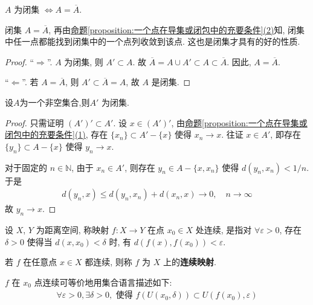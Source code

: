 \documentclass[../../main.tex]{subfiles}
\begin{document}
\begin{theorem}
$A$ 为闭集 $\Leftrightarrow A = \overline{A}$.
\end{theorem}
\begin{remark}
闭集 $A = \overline{A}$, 再由\hyperref[proposition:一个点在导集或闭包中的充要条件]{命题\ref{proposition:一个点在导集或闭包中的充要条件}(2)}知, 闭集中任一点都能找到闭集中的一个点列收敛到该点. 这也是闭集才具有的好的性质.
\end{remark}
\begin{proof}
“$\Rightarrow$”. $A$ 为闭集, 则 $A' \subset A$. 故 $\overline{A} = A \cup A' \subset A \subset \overline{A}$. 因此, $A = \overline{A}$.

“$\Leftarrow$”. 若 $A = \overline{A}$, 则 $A' \subset \overline{A} = A$, 故 $A$ 是闭集.

\end{proof}

\begin{theorem}
设$A$为一个非空集合,则$A'$ 为闭集.
\end{theorem}
\begin{proof}
只需证明 $(A')' \subset A'$. 设 $x \in (A')'$, 由\hyperref[proposition:一个点在导集或闭包中的充要条件]{命题\ref{proposition:一个点在导集或闭包中的充要条件}(1)}, 存在 $\{x_n\} \subset A' - \{x\}$ 使得 $x_n \to x$. 往证 $x \in A'$, 即存在 $\{y_n\} \subset A - \{x\}$ 使得 $y_n \to x$.

对于固定的 $n \in \mathbb{N}$, 由于 $x_n \in A'$, 则存在 $y_n \in A - \{x, x_n\}$ 使得 $d(y_n, x_n) < 1/n$. 于是
\begin{align*}
d(y_n, x) \leqslant d(y_n, x_n) + d(x_n, x) \to 0, \quad n \to \infty
\end{align*}
故 $y_n \to x$.

\end{proof}

\begin{definition}[连续映射]
设 $X$, $Y$ 为距离空间, 称映射 $f : X \to Y$ 在点 $x_0 \in X$ 处连续, 是指对 $\forall \varepsilon > 0$, 存在 $\delta > 0$ 使得当 $d(x, x_0) < \delta$ 时, 有 $d(f(x), f(x_0)) < \varepsilon$.

若 $f$ 在任意点 $x \in X$ 都连续, 则称 $f$ 为 $X$ 上的\textbf{连续映射}.
\end{definition}
\begin{remark}
$f$ 在 $x_0$ 点连续可等价地用集合语言描述如下:
\begin{align*}
\forall \varepsilon > 0, \exists \delta > 0, \text{ 使得 } f(U(x_0, \delta)) \subset U(f(x_0), \varepsilon)
\end{align*}
\end{remark}
\end{document}
